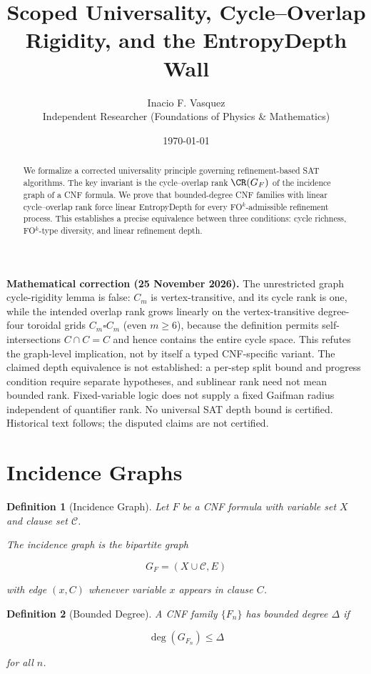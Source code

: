 \documentclass[11pt]{article}
\title{Scoped Universality, Cycle–Overlap Rigidity, and the EntropyDepth Wall}
\author{Inacio F. Vasquez \\ Independent Researcher (Foundations of Physics \& Mathematics)}
\date{\today}
\newtheorem{definition}{Definition}
\begin{document}
\maketitle
\par\noindent\textbf{Mathematical correction (25 November 2026).} The unrestricted graph cycle-rigidity lemma is false: $C_m$ is vertex-transitive, and its cycle rank is one, while the intended overlap rank grows linearly on the vertex-transitive degree-four toroidal grids $C_m\square C_m$ (even $m\ge6$), because the definition permits self-intersections $C\cap C=C$ and hence contains the entire cycle space. This refutes the graph-level implication, not by itself a typed CNF-specific variant. The claimed depth equivalence is not established: a per-step split bound and progress condition require separate hypotheses, and sublinear rank need not mean bounded rank. Fixed-variable logic does not supply a fixed Gaifman radius independent of quantifier rank. No universal SAT depth bound is certified. Historical text follows; the disputed claims are not certified.\par


\begin{abstract}
We formalize a corrected universality principle governing refinement-based SAT algorithms.
The key invariant is the cycle–overlap rank $\CR(G_F)$ of the incidence graph of a CNF formula.
We prove that bounded-degree CNF families with linear cycle–overlap rank force linear
EntropyDepth for every FO$^k$-admissible refinement process.  
This establishes a precise equivalence between three conditions: cycle richness,
FO$^k$-type diversity, and linear refinement depth.
\end{abstract}

\section{Incidence Graphs}

\begin{definition}[Incidence Graph]
Let $F$ be a CNF formula with variable set $X$ and clause set $\mathcal{C}$.

The \emph{incidence graph} is the bipartite graph

\[
G_F = (X \cup \mathcal{C},E)
\]

with edge $(x,C)$ whenever variable $x$ appears in clause $C$.
\end{definition}

\begin{definition}[Bounded Degree]
A CNF family $\{F_n\}$ has bounded degree $\Delta$ if

\[
\deg(G_{F_n}) \le \Delta
\]

for all $n$.
\end{definition}
\end{document}
